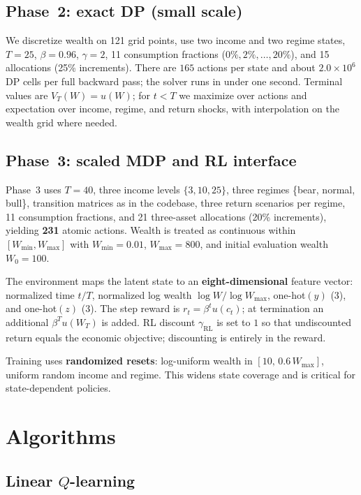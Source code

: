 \documentclass[11pt,a4paper]{article}
\begin{document}
\subsection{Phase~2: exact DP (small scale)}

We discretize wealth on 121 grid points, use two income and two regime states, $T=25$, $\beta=0.96$, $\gamma=2$, 11 consumption fractions ($0\%, 2\%, \ldots, 20\%$), and 15 allocations (25\% increments). There are $165$ actions per state and about $2.0\times 10^6$ DP cells per full backward pass; the solver runs in under one second. Terminal values are $V_T(W)=u(W)$; for $t<T$ we maximize over actions and expectation over income, regime, and return shocks, with interpolation on the wealth grid where needed.

\subsection{Phase~3: scaled MDP and RL interface}

Phase~3 uses $T=40$, three income levels $\{3,10,25\}$, three regimes \{bear, normal, bull\}, transition matrices as in the codebase, three return scenarios per regime, 11 consumption fractions, and 21 three-asset allocations (20\% increments), yielding \textbf{231} atomic actions. Wealth is treated as continuous within $[W_{\min}, W_{\max}]$ with $W_{\min}=0.01$, $W_{\max}=800$, and initial evaluation wealth $W_0=100$.

The environment maps the latent state to an \textbf{eight-dimensional} feature vector: normalized time $t/T$, normalized log wealth $\log W / \log W_{\max}$, one-hot$(y)$ (3), and one-hot$(z)$ (3). The step reward is $r_t = \beta^t u(c_t)$; at termination an additional $\beta^T u(W_T)$ is added. RL discount $\gamma_{\mathrm{RL}}$ is set to $1$ so that undiscounted return equals the economic objective; discounting is entirely in the reward.

Training uses \textbf{randomized resets}: log-uniform wealth in $[10,\,0.6\,W_{\max}]$, uniform random income and regime. This widens state coverage and is critical for state-dependent policies.

\section{Algorithms}

\subsection{\texorpdfstring{Linear $Q$-learning}{Linear Q-learning}}
\end{document}

